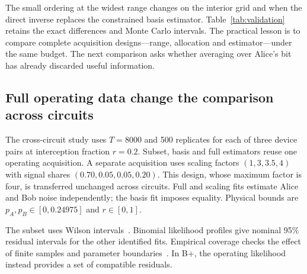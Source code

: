 \documentclass[manuscript,screen,review,anonymous]{acmart}
\begin{document}
The small ordering at the widest range changes on the interior grid and when
the direct inverse replaces the constrained basis estimator. Table~\ref{tab:validation}
retains the exact differences and Monte Carlo intervals. The practical lesson
is to compare complete acquisition designs---range, allocation and estimator---under
the same budget. The next comparison asks whether averaging over Alice's bit
has already discarded useful information.

\subsection{Full operating data change the comparison across circuits}
The cross-circuit study uses $T=8000$ and 500 replicates for each of three device
pairs at interception fraction $r=0.2$. Subset, basis and full estimators reuse
one operating acquisition. A separate acquisition uses scaling factors
$(1,3,3.5,4)$ with signal shares $(0.70,0.05,0.05,0.20)$.
This design, whose maximum factor is four, is transferred unchanged across
circuits. Full and scaling fits estimate Alice and Bob noise independently;
the basis fit imposes equality. Physical bounds are
$p_A,p_B\in[0,0.24975]$ and $r\in[0,1]$.

The subset uses Wilson intervals~\cite{wilson1927}. Binomial likelihood
profiles give nominal 95\% residual intervals for the other identified fits.
Empirical coverage checks the effect of finite samples and parameter
boundaries~\cite{fischer2021}. In B+, the operating likelihood instead
provides a set of compatible residuals.
\end{document}
